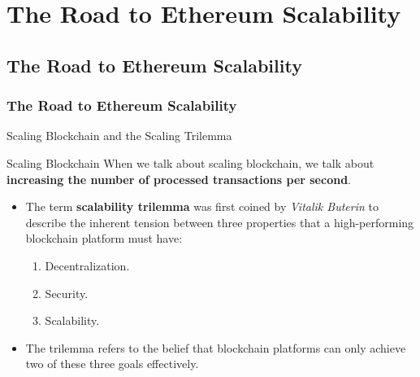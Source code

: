 

\renewcommand{\mytitle}{The Road to Ethereum Scalability}
\ifZEROSEC \fi
\ifSEC \section{\mytitle{}}\fi
\ifSUBSEC \subsection{\mytitle{}}\fi
\ifSUBSUBSEC \subsubsection{\mytitle{}}\fi


\begin{frame} {Scaling Blockchain and the Scaling Trilemma}
\begin{block}{Scaling Blockchain}
When we talk about scaling blockchain, we talk about \textbf{increasing the number of processed transactions per second}.
\end{block}
\begin{itemize}
\item The term \textbf{scalability trilemma} was first coined by \textit{Vitalik Buterin} to describe the inherent tension between three properties that a high-performing blockchain platform must have:
  \begin{enumerate}
  \item Decentralization.
  \item Security.
  \item Scalability.
  \end{enumerate}
\item The trilemma refers to the belief that blockchain platforms can only achieve two of these three goals effectively.
\end{itemize}
\end{frame}



